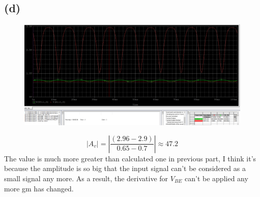 \documentclass[12pt]{article}
\begin{document}
\subsection{(d)}
\begin{figure}[H]
\centering
\includegraphics[scale=0.25]{P3.png}
\end{figure}
$$|A_v|=|\frac{(2.96-2.9)}{0.65-0.7}|\approx47.2$$
The value is much more greater than calculated one in previous part, I think it's because the amplitude is so big that the input signal can't be considered as a small signal any more. As a result, the derivative for $V_{BE}$ can't be applied any more gm has changed.
\end{document}
